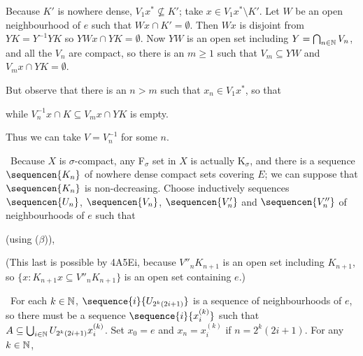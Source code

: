 {

Because $K'$ is nowhere dense, $V_1x^*\not\subseteq K'$;  take
$x\in V_1x^*\setminus K'$.   Let $W$ be an open
neighbourhood of $e$ such that $Wx\cap K'=\emptyset$.   Then $Wx$ is
disjoint from $YK=Y^{-1}YK$ so $YWx\cap YK=\emptyset$.   Now
$YW$ is an open set including $Y=\bigcap_{n\in\Bbb N}V_n$, and
all the $V_n$ are compact, so there is an $m\ge 1$ such that
$V_m\subseteq Y W$ and $V_mx\cap YK=\emptyset$.

But observe that there is an $n>m$ such that
$x_n\in V_1x^*$, so that


\noindent while $V_n^{-1}x\cap K\subseteq V_mx\cap YK$ is empty.\
\Bang

Thus we can take $V=V_n^{-1}$ for some $n$.\ \Qed

\medskip

\quad\grheadc\ Because $X$ is
$\sigma$-compact, any F$_{\sigma}$ set in $X$ is actually K$_{\sigma}$,
and there is
a sequence $\sequencen{K_n}$ of nowhere dense compact sets covering $E$;
we can suppose that $\sequencen{K_n}$ is non-decreasing.   Choose
inductively sequences $\sequencen{U_n}$, $\sequencen{V_n}$,
$\sequencen{V'_n}$ and $\sequencen{V''_n}$ of neighbourhoods of $e$
such that


\noindent (using ($\beta$)),


\noindent (This last is possible by 4A5Ei, because $V''_nK_{n+1}$ is
an open set including $K_{n+1}$,
so $\{x:K_{n+1}x\subseteq V''_nK_{n+1}\}$ is
an open set containing $e$.)

\medskip

\quad\grheadd\ For each $k\in\Bbb N$, $\sequence{i}{U_{2^k(2i+1)}}$
is a sequence of neighbourhoods of $e$, so there must be a sequence
$\sequence{i}{x^{(k)}_i}$ such that
$A\subseteq\bigcup_{i\in\Bbb N}U_{2^k(2i+1)}x^{(k)}_i$.
Set $x_0=e$ and $x_n=x^{(k)}_i$ if $n=2^k(2i+1)$.   For any $k\in\Bbb N$,

}
